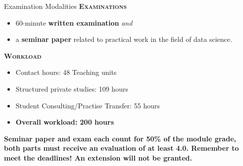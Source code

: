\documentclass[document.tex]{subfiles}
\begin{document}
    \begin{frame}{Examination Modalities}
        \alert{\textbf{\textsc{Examinations}}}
        \vspace{-1mm}
        \begin{itemize}
            \item 60-minute \textbf{written examination} \textit{and}
            \item a \textbf{seminar paper} related to practical work in the field of data science.
        \end{itemize}

        \alert{\textbf{\textsc{Workload}}}
        \vspace{-1mm}
        \begin{itemize}
            \item Contact hours: 48 Teaching units
            \item Structured private studies: 109 hours
            \item Student Consulting/Practise Transfer: 55 hours
            \item \textbf{Overall workload: 200 hours}
        \end{itemize}
        	
        \textbf{Seminar paper and exam each count for 50\% of the module grade, both parts must receive an evaluation of at least 4.0. Remember to meet the deadlines! An extension will not be granted.}
    \end{frame}
\end{document}
